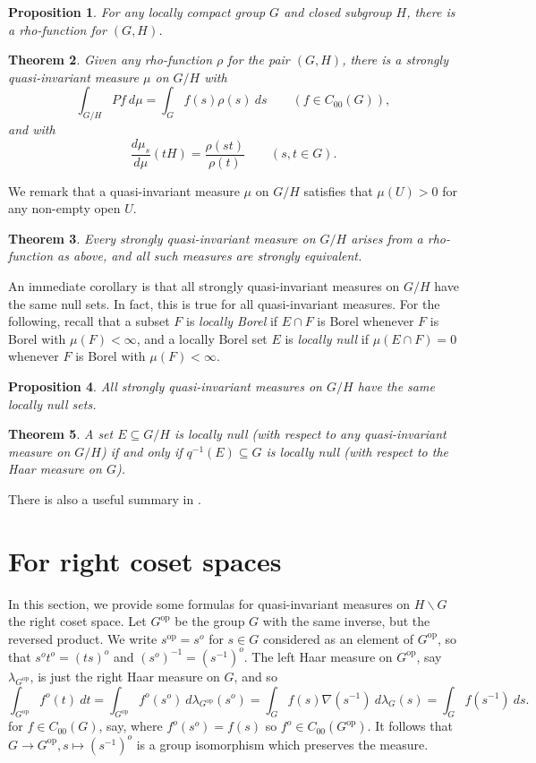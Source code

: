 \documentclass[11pt,a4paper]{article}
\newtheorem{theorem}{Theorem}[section]
\newtheorem{proposition}[theorem]{Proposition}
\theoremstyle{definition}
\newcommand{\bs}{\backslash}
\newcommand{\op}{{\operatorname{op}}}
\begin{document}
\begin{proposition}
For any locally compact group $G$ and closed subgroup $H$, there is a rho-function for
$(G,H)$.
\end{proposition}

\begin{theorem}\label{thm:1}
Given any rho-function $\rho$ for the pair $(G,H)$, there is a strongly quasi-invariant measure
$\mu$ on $G/H$ with
\[ \int_{G/H} Pf \ d\mu = \int_G f(s) \rho(s) \ ds \qquad (f\in C_{00}(G)), \]
and with
\[ \frac{d\mu_s}{d\mu}(tH) = \frac{\rho(st)}{\rho(t)} \qquad (s,t\in G). \]
\end{theorem}

We remark that a quasi-invariant measure $\mu$ on $G/H$ satisfies that $\mu(U)>0$ for any
non-empty open $U$.

\begin{theorem}
Every strongly quasi-invariant measure on $G/H$ arises from a rho-function as above, and all
such measures are strongly equivalent.
\end{theorem}

An immediate corollary is that all strongly quasi-invariant measures on $G/H$ have the same
null sets.  In fact, this is true for all quasi-invariant measures.
For the following, recall that a subset $F$ is \emph{locally Borel} if $E\cap F$ is Borel
whenever $F$ is Borel with $\mu(F)<\infty$, and a locally Borel set $E$ is \emph{locally null}
if $\mu(E\cap F)=0$ whenever $F$ is Borel with $\mu(F)<\infty$.

\begin{proposition}
All strongly quasi-invariant measures on $G/H$ have the same locally null sets.
\end{proposition}

\begin{theorem}
A set $E\subseteq G/H$ is locally null (with respect to any quasi-invariant measure on $G/H$)
if and only if $q^{-1}(E)\subseteq G$ is locally null (with respect to the Haar measure on $G$).
\end{theorem}

There is also a useful summary in \cite[Appendix~B]{bhv}.


\section{For right coset spaces}

In this section, we provide some formulas for quasi-invariant measures on $H \bs G$
the right coset space.  Let $G^\op$ be the group $G$ with the same inverse, but the reversed
product.  We write $s^\op = s^o$ for $s\in G$ considered as an element of $G^\op$, so that
$s^o t^o = (ts)^o$ and $(s^o)^{-1} = (s^{-1})^o$.  The left Haar measure on $G^\op$, say
$\lambda_{G^\op}$, is just the right Haar measure on $G$, and so
\[ \int_{G^\op} f^o(t) \ dt =
\int_{G^\op} f^o(s^o) \ d\lambda_{G^\op}(s^o) =
\int_G f(s) \nabla(s^{-1}) \ d\lambda_G(s)
= \int_G f(s^{-1}) \ ds.  \]
for $f\in C_{00}(G)$, say, where $f^o(s^o) = f(s)$ so $f^o\in C_{00}(G^\op)$.
It follows that $G\rightarrow G^\op, s\mapsto (s^{-1})^o$ is a group isomorphism which
preserves the measure.
\end{document}
